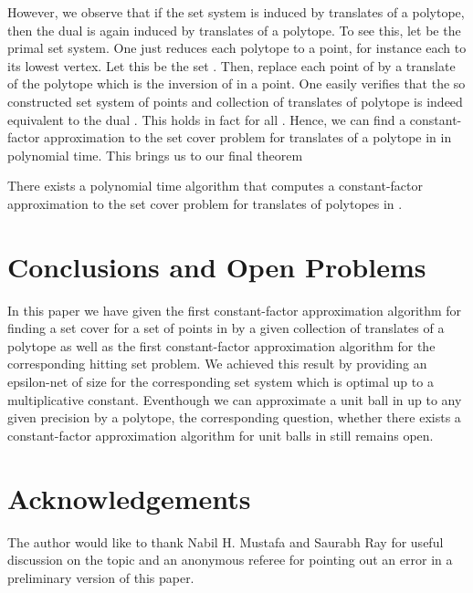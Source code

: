 \documentclass{stacs_proc}
\begin{document}
However, we observe that if the set system is induced by translates of
a polytope, then the dual is again induced by  translates of a
polytope. 
To see this, let  be the primal set system. One just reduces
each polytope  to a point, for instance each to its lowest
vertex. Let this be the set . Then, replace each point of  by a
translate of the polytope  which is the inversion of  in a
point. One easily verifies that the so constructed set system  of points  and collection of translates of polytope  is
indeed equivalent to the dual .      
This holds in fact for all .    
Hence, we can find a constant-factor approximation to the set cover
problem for translates of a polytope in  in polynomial time. 
This brings us to our final theorem
\begin{theorem}
  There exists a polynomial time algorithm that computes a
  constant-factor approximation to the set cover problem for
  translates of polytopes in . 
\end{theorem} 


\vskip-0.3cm
\section{Conclusions and Open Problems}
In this paper we have given the first constant-factor approximation
algorithm for finding a set cover for a set of points in  by a
given collection of  translates of a polytope as well as the first
constant-factor approximation algorithm for the corresponding hitting
set problem.  We achieved this result by providing an epsilon-net of
size  for the corresponding set system which is
optimal up to a multiplicative constant. 
Eventhough we can approximate a unit ball in  up to any given
precision by a polytope, the corresponding question, whether there
exists a constant-factor approximation algorithm for unit balls in
 still remains open.    

\vskip-0.3cm
\section*{Acknowledgements}
The author would like to thank Nabil H. Mustafa and Saurabh Ray for
useful discussion on the topic and an anonymous referee for pointing
out an error in a preliminary version of this paper. 













\end{document}
